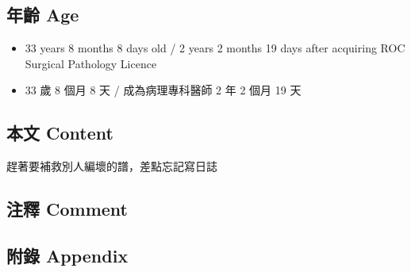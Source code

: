 \documentclass[
]{article}
\providecommand{\tightlist}{%
  \setlength{\itemsep}{0pt}\setlength{\parskip}{0pt}}
\begin{document}
\hypertarget{ux5e74ux9f61-age-30}{%
\subsection{年齡 Age}\label{ux5e74ux9f61-age-30}}

\begin{itemize}
\tightlist
\item
  33 years 8 months 8 days old / 2 years 2 months 19 days after
  acquiring ROC Surgical Pathology Licence
\item
  33 歲 8 個月 8 天 / 成為病理專科醫師 2 年 2 個月 19 天
\end{itemize}

\hypertarget{ux672cux6587-content-30}{%
\subsection{本文 Content}\label{ux672cux6587-content-30}}

趕著要補救別人編壞的譜，差點忘記寫日誌

\hypertarget{ux6ce8ux91cb-comment-29}{%
\subsection{注釋 Comment}\label{ux6ce8ux91cb-comment-29}}

\hypertarget{ux9644ux9304-appendix-30}{%
\subsection{附錄 Appendix}\label{ux9644ux9304-appendix-30}}
\end{document}
